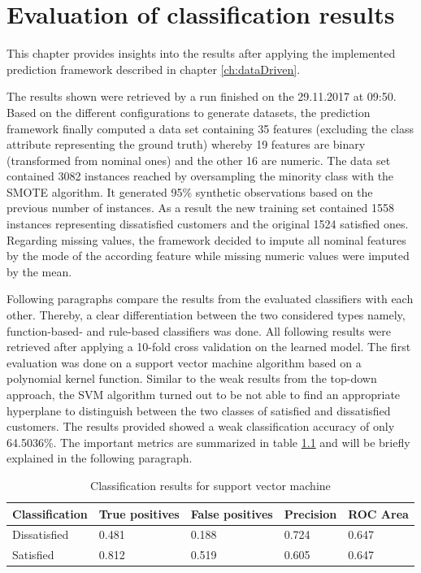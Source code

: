 \chapter{Evaluation of classification results}
\label{ch:evaluation}

This chapter provides insights into the results after applying the implemented prediction framework described in chapter \ref{ch:dataDriven}. 

The results shown were retrieved by a run finished on the 29.11.2017 at 09:50. Based on the different configurations to generate datasets, the prediction framework finally computed a data set containing 35 features (excluding the class attribute representing the ground truth) whereby 19 features are binary (transformed from nominal ones) and the other 16 are numeric. The data set contained 3082 instances reached by oversampling the minority class with the SMOTE algorithm. It generated 95\% synthetic observations based on the previous number of instances. As a result the new training set contained 1558 instances representing dissatisfied customers and the original 1524 satisfied ones. Regarding missing values, the framework decided to impute all nominal features by the mode of the according feature while missing numeric values were imputed by the mean.  	

Following paragraphs compare the results from the evaluated classifiers with each other. Thereby, a clear differentiation between the two considered types namely, function-based- and rule-based classifiers was done. All following results were retrieved after applying a 10-fold cross validation on the learned model. The first evaluation was done on a support vector machine algorithm based on a polynomial kernel function. Similar to the weak results from the top-down approach, the SVM algorithm turned out to be not able to find an appropriate hyperplane to distinguish between the two classes of satisfied and dissatisfied customers. The results provided showed a weak classification accuracy of only 64.5036\%. The important metrics are summarized in table \ref{tab:svmResults} and will be briefly explained in the following paragraph. 

\begin{table}[]
	\centering
	\begin{tabular}{|l|l|l|l|l|}
		\hline
		\textbf{Classification} & \textbf{True positives} & \textbf{False positives} & \textbf{Precision} & \textbf{ROC Area} \\ \hline
		Dissatisfied            & 0.481                  & 0.188                    & 0.724              & 0.647             \\ \hline
		Satisfied               & 0.812                   & 0.519                    & 0.605                & 0.647             \\ \hline
	\end{tabular}
	\caption{Classification results for support vector machine}
	\label{tab:svmResults}
\end{table}


